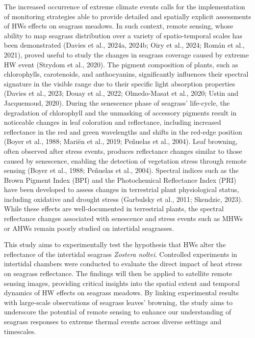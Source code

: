 \documentclass[
  letterpaper,
  DIV=11,
  numbers=noendperiod]{scrartcl}
\begin{document}
The increased occurrence of extreme climate events calls for the
implementation of monitoring strategies able to provide detailed and
spatially explicit assessments of HWs effects on seagrass meadows. In
such context, remote sensing, whose ability to map seagrass distribution
over a variety of spatio-temporal scales has been demonstrated (Davies
et al., 2024a, 2024b; Oiry et al., 2024; Román et al., 2021), proved
useful to study the changes in seagrass coverage caused by extreme HW
event (Strydom et al., 2020). The pigment composition of plants, such as
chlorophylls, carotenoids, and anthocyanins, significantly influences
their spectral signature in the visible range due to their specific
light absorption properties (Davies et al., 2023; Douay et al., 2022;
Olmedo-Masat et al., 2020; Ustin and Jacquemoud, 2020). During the
senescence phase of seagrass' life-cycle, the degradation of chlorophyll
and the unmasking of accessory pigments result in noticeable changes in
leaf coloration and reflectance, including increased reflectance in the
red and green wavelengths and shifts in the red-edge position (Boyer et
al., 1988; Mariën et al., 2019; Peñuelas et al., 2004). Leaf browning,
often observed after stress events, produces reflectance changes similar
to those caused by senescence, enabling the detection of vegetation
stress through remote sensing (Boyer et al., 1988; Peñuelas et al.,
2004). Spectral indices such as the Brown Pigment Index (BPI) and the
Photochemical Reflectance Index (PRI) have been developed to assess
changes in terrestrial plant physiological status, including oxidative
and drought stress (Garbulsky et al., 2011; Skendzic, 2023). While these
effects are well-documented in terrestrial plants, the spectral
reflectance changes associated with senescence and stress events such as
MHWs or AHWs remain poorly studied on intertidal seagrasses.

This study aims to experimentally test the hypothesis that HWs alter the
reflectance of the intertidal seagrass \emph{Zostera noltei}. Controlled
experiments in intertidal chambers were conducted to evaluate the direct
impact of heat stress on seagrass reflectance. The findings will then be
applied to satellite remote sensing images, providing critical insights
into the spatial extent and temporal dynamics of HW effects on seagrass
meadows. By linking experimental results with large-scale observations
of seagrass leaves' browning, the study aims to underscore the potential
of remote sensing to enhance our understanding of seagrass responses to
extreme thermal events across diverse settings and timescales.
\end{document}
